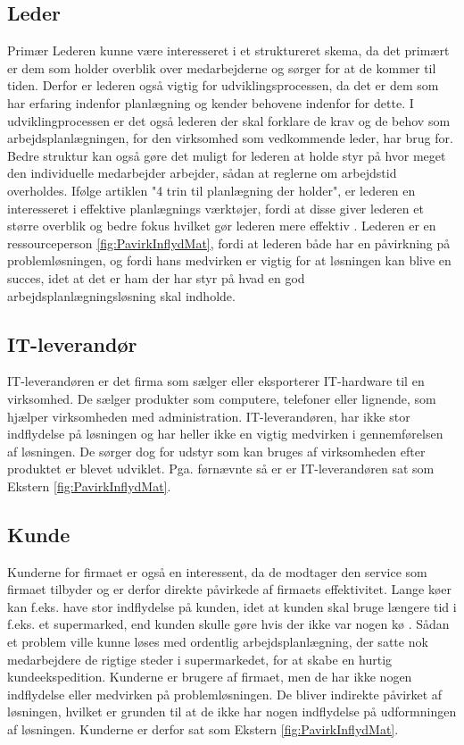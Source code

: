 \subsection{Leder} Primær
Lederen kunne være interesseret i et struktureret skema, da det primært er dem som holder overblik over medarbejderne og sørger for at de kommer til tiden. Derfor er lederen også vigtig for udviklingsprocessen, da det er dem som har erfaring indenfor planlægning og kender behovene indenfor for dette. I udviklingprocessen er det også lederen der skal forklare de krav og de behov som arbejdsplanlægningen, for den virksomhed som vedkommende leder, har brug for. Bedre struktur kan også gøre det muligt for lederen at holde styr på hvor meget den individuelle medarbejder arbejder, sådan at reglerne om arbejdstid overholdes.
Ifølge artiklen "4 trin til planlægning der holder", er lederen en interesseret i effektive planlægnings værktøjer, fordi at disse giver lederen et større overblik og bedre fokus hvilket gør lederen mere effektiv \citep{Kolding2012}. Lederen er en ressourceperson \ref{fig:PavirkInflydMat}, fordi at lederen både har en påvirkning på problemløsningen,  og fordi hans medvirken er vigtig for at løsningen kan blive en succes, idet at det er ham der har styr på hvad en god arbejdsplanlægningsløsning skal indholde.

\subsection{IT-leverandør}
IT-leverandøren er det firma som sælger eller eksporterer IT-hardware til en virksomhed. De sælger produkter som computere, telefoner eller lignende, som hjælper virksomheden med administration.
IT-leverandøren, har ikke stor indflydelse på løsningen og har heller ikke en vigtig medvirken i gennemførelsen af løsningen. De sørger dog for udstyr som kan bruges af virksomheden efter produktet er blevet udviklet. Pga. førnævnte så er er IT-leverandøren sat som Ekstern \ref{fig:PavirkInflydMat}.

\subsection{Kunde}
Kunderne for firmaet er også en interessent, da de modtager den service som firmaet tilbyder og er derfor direkte påvirkede af firmaets effektivitet. Lange køer kan f.eks. have stor indflydelse på kunden, idet at kunden skal bruge længere tid i f.eks. et supermarked, end kunden skulle gøre hvis der ikke var nogen kø \citep{Brix2012}. Sådan et problem ville kunne løses med ordentlig arbejdsplanlægning, der satte nok medarbejdere de rigtige steder i supermarkedet, for at skabe en hurtig kundeekspedition. Kunderne er brugere af firmaet, men de har ikke nogen indflydelse eller medvirken på problemløsningen. De bliver indirekte påvirket af løsningen, hvilket er grunden til at de ikke har nogen indflydelse på udformningen af løsningen. Kunderne er derfor sat som Ekstern \ref{fig:PavirkInflydMat}.

